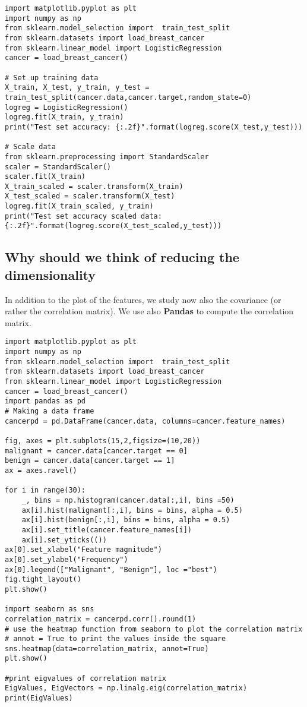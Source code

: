 \documentclass[%
oneside,                 %
final,                   %
10pt]{article}
\begin{document}
\begin{verbatim}
import matplotlib.pyplot as plt
import numpy as np
from sklearn.model_selection import  train_test_split 
from sklearn.datasets import load_breast_cancer
from sklearn.linear_model import LogisticRegression
cancer = load_breast_cancer()

# Set up training data
X_train, X_test, y_train, y_test = train_test_split(cancer.data,cancer.target,random_state=0)
logreg = LogisticRegression()
logreg.fit(X_train, y_train)
print("Test set accuracy: {:.2f}".format(logreg.score(X_test,y_test)))

# Scale data
from sklearn.preprocessing import StandardScaler
scaler = StandardScaler()
scaler.fit(X_train)
X_train_scaled = scaler.transform(X_train)
X_test_scaled = scaler.transform(X_test)
logreg.fit(X_train_scaled, y_train)
print("Test set accuracy scaled data: {:.2f}".format(logreg.score(X_test_scaled,y_test)))

\end{verbatim}




\subsection*{Why should we think of reducing the dimensionality}

In addition to the plot of the features, we study now also the covariance (or rather the correlation matrix).
We use also \textbf{Pandas} to compute the correlation matrix.
\begin{verbatim}
import matplotlib.pyplot as plt
import numpy as np
from sklearn.model_selection import  train_test_split 
from sklearn.datasets import load_breast_cancer
from sklearn.linear_model import LogisticRegression
cancer = load_breast_cancer()
import pandas as pd
# Making a data frame
cancerpd = pd.DataFrame(cancer.data, columns=cancer.feature_names)

fig, axes = plt.subplots(15,2,figsize=(10,20))
malignant = cancer.data[cancer.target == 0]
benign = cancer.data[cancer.target == 1]
ax = axes.ravel()

for i in range(30):
    _, bins = np.histogram(cancer.data[:,i], bins =50)
    ax[i].hist(malignant[:,i], bins = bins, alpha = 0.5)
    ax[i].hist(benign[:,i], bins = bins, alpha = 0.5)
    ax[i].set_title(cancer.feature_names[i])
    ax[i].set_yticks(())
ax[0].set_xlabel("Feature magnitude")
ax[0].set_ylabel("Frequency")
ax[0].legend(["Malignant", "Benign"], loc ="best")
fig.tight_layout()
plt.show()

import seaborn as sns
correlation_matrix = cancerpd.corr().round(1)
# use the heatmap function from seaborn to plot the correlation matrix
# annot = True to print the values inside the square
sns.heatmap(data=correlation_matrix, annot=True)
plt.show()

#print eigvalues of correlation matrix
EigValues, EigVectors = np.linalg.eig(correlation_matrix)
print(EigValues)
\end{verbatim}
\end{document}
